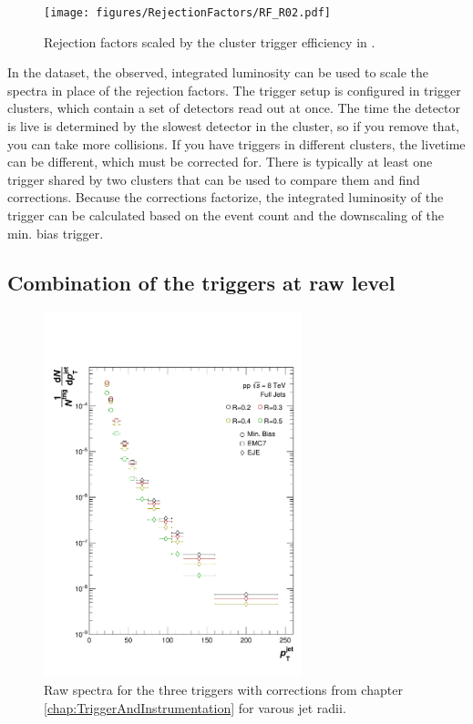 \begin{figure}
    \centering
    \texttt{[image: figures/RejectionFactors/RF\_R02.pdf]}
    \caption{Rejection factors scaled by the cluster trigger efficiency in \pp.}
    \label{fig:RejectionFactors}
\end{figure}

In the \pPb dataset, the observed, integrated luminosity can be used to scale the spectra in place of the rejection factors. The trigger setup is configured in trigger clusters, which contain a set of detectors read out at once. The time the detector is live is determined by the slowest detector in the cluster, so if you remove that, you can take more collisions. If you have triggers in different clusters, the livetime can be different, which must be corrected for. There is typically at least one trigger shared by two clusters that can be used to compare them and find corrections. Because the corrections factorize, the integrated luminosity of the trigger can be calculated based on the event count and the downscaling of the min. bias trigger.

\subsection{Combination of the triggers at raw level}
\label{sec:triggerCombination}

\begin{figure}
    \centering
    \includegraphics[width=7.5cm]{figures/CorrRawSpec/corrRawSpec.pdf}
    \caption{Raw spectra for the three triggers with corrections from chapter \ref{chap:TriggerAndInstrumentation} for varous jet radii.}
    \label{fig:CorrRawSpec}
\end{figure}

